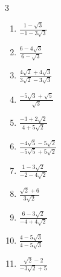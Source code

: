 \begin{multicols}{3}
\begin{enumerate}
  \item $\displaystyle \frac{1-\sqrt{3}}{-1-3\sqrt{3}}$


  \item $\displaystyle \frac{6-4\sqrt{3}}{6-\sqrt{3}}$


  \item $\displaystyle \frac{4\sqrt{2}+4\sqrt{3}}{3\sqrt{2}-3\sqrt{3}}$


  \item $\displaystyle \frac{-5\sqrt{3}+\sqrt{5}}{\sqrt{3}}$


\columnbreak %

  \item $\displaystyle \frac{-3+2\sqrt{2}}{4+5\sqrt{2}}$


  \item $\displaystyle \frac{-4\sqrt{5}-5\sqrt{2}}{-5\sqrt{5}+5\sqrt{2}}$


  \item $\displaystyle \frac{1-3\sqrt{2}}{-2-4\sqrt{2}}$


  \item $\displaystyle \frac{\sqrt{2}+6}{3\sqrt{2}}$


  \item $\displaystyle \frac{6-3\sqrt{2}}{-4+4\sqrt{2}}$


\columnbreak %

  \item $\displaystyle \frac{4-5\sqrt{3}}{4-5\sqrt{3}}$

        \phantom{$\displaystyle =1$}

  \item $\displaystyle \frac{\sqrt{2}-2}{-3\sqrt{2}+5}$


\end{enumerate}
\end{multicols}
